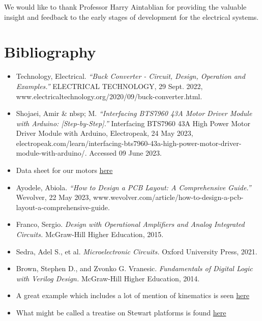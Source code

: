 \documentclass[a4paper, 10pt]{article}
\begin{document}
	We would like to thank Professor Harry Aintablian for providing the valuable insight and feedback to the early stages of development for the electrical systems. 

\section{Bibliography}
	\begin{itemize}
		\item Technology, Electrical. \textit{“Buck Converter - Circuit, Design, Operation and Examples.”} ELECTRICAL TECHNOLOGY, 29 Sept. 2022, www.electricaltechnology.org/2020/09/buck-converter.html.		
		
		\item Shojaei, Amir \& nbsp; M. \textit{“Interfacing BTS7960 43A Motor Driver Module with Arduino: [Step-by-Step].”} Interfacing BTS7960 43A High Power Motor Driver Module with Arduino, Electropeak, 24 May 2023, electropeak.com/learn/interfacing-bts7960-43a-high-power-motor-driver-module-with-arduino/. Accessed 09 June 2023.
		
		\item Data sheet for our motors \href{https://www.servocity.com/content/downloads/118_rpm_hd_precision_planetary_gearmotor_-_specifications_1.pdf} {here}
		
		\item Ayodele, Abiola. \textit{“How to Design a PCB Layout: A Comprehensive Guide.”} Wevolver, 22 May 2023, www.wevolver.com/article/how-to-design-a-pcb-layout-a-comprehensive-guide.
		
		\item Franco, Sergio. \textit{Design with Operational Amplifiers and Analog Integrated Circuits.} McGraw-Hill Higher Education, 2015.
				
		\item Sedra, Adel S., et al. \textit{Microelectronic Circuits.} Oxford University Press, 2021. 		
		
		\item Brown, Stephen D., and Zvonko G. Vranesic. \textit{Fundamentals of Digital Logic with Verilog Design.} McGraw-Hill Higher Education, 2014. 
		
		\item A great example which includes a lot of mention of kinematics is seen \href{https://ntrs.nasa.gov/api/citations/19910007810/downloads/19910007810.pdf}{here}
		
		\item What might be called a treatise on Stewart platforms is found \href{https://www.ri.cmu.edu/pub_files/pub4/fong_terrence_w_1990_1/fong_terrence_w_1990_1.pdf}{here}
		

\end{itemize}
\end{document}
